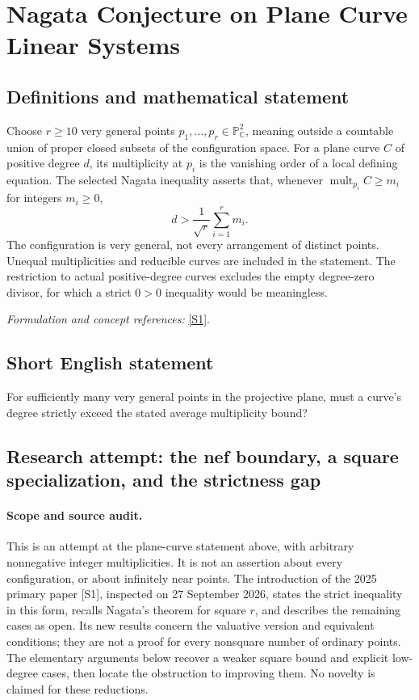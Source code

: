 \documentclass[11pt]{article}
\begin{document}
\section*{\texorpdfstring{Nagata Conjecture on Plane Curve Linear Systems}{Nagata Conjecture on Plane Curve Linear Systems}}\label{statement}
\subsection{Definitions and mathematical statement}
Choose $r\ge10$ very general points $p_1,\ldots,p_r\in{\mathbb{P}}^2_{{\mathbb{C}}}$, meaning outside a countable union of proper closed subsets of the configuration space. For a plane curve $C$ of positive degree $d$, its multiplicity at $p_i$ is the vanishing order of a local defining equation. The selected Nagata inequality asserts that, whenever $\operatorname{mult}_{p_i}C\ge m_i$ for integers $m_i\ge0$,
\[
 d>\frac1{\sqrt r}\sum_{i=1}^r m_i.
\]
The configuration is very general, not every arrangement of distinct points. Unequal multiplicities and reducible curves are included in the statement. The restriction to actual positive-degree curves excludes the empty degree-zero divisor, for which a strict $0>0$ inequality would be meaningless.
\par\smallskip\textit{Formulation and concept references:} \href{https://link.springer.com/article/10.1007/s40687-025-00500-2}{[S1]}.

\subsection{Short English statement}
For sufficiently many very general points in the projective plane, must a curve's degree strictly exceed the stated average multiplicity bound?
\subsection{Research attempt: the nef boundary, a square specialization, and the strictness gap}
\paragraph{Scope and source audit.}
This is an attempt at the plane-curve statement above, with arbitrary nonnegative integer multiplicities. It is not an assertion about every configuration, or about infinitely near points. The introduction of the 2025 primary paper [S1], inspected on 27 September 2026, states the strict inequality in this form, recalls Nagata's theorem for square $r$, and describes the remaining cases as open. Its new results concern the valuative version and equivalent conditions; they are not a proof for every nonsquare number of ordinary points. The elementary arguments below recover a weaker square bound and explicit low-degree cases, then locate the obstruction to improving them. No novelty is claimed for these reductions.
\end{document}
